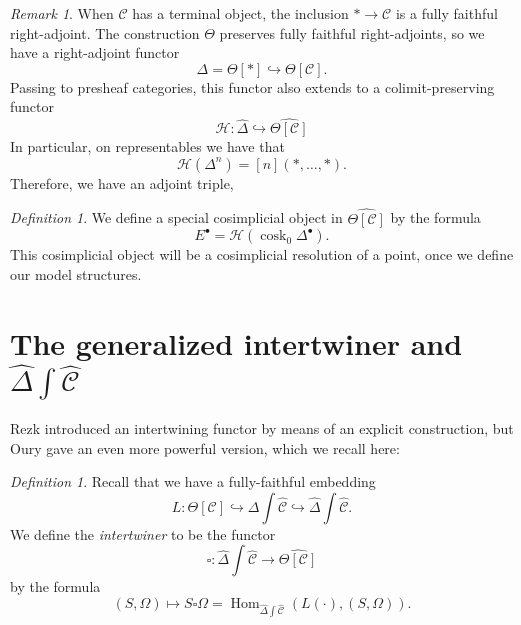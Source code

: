 \documentclass{amsart}
\numberwithin{equation}{section}
\theoremstyle{plain}   %
\theoremstyle{remark}
\newtheorem{rem}[subsection]{Remark}
\newtheorem{defn}[subsection]{Definition}
\theoremstyle{plain}
\DeclareMathOperator{\Hom}{Hom}
\newcommand{\psh}[1]{\ensuremath{\widehat{#1}}}
\newcommand{\C}{\ensuremath{\mathcal{C}}}
\newcommand{\cellset}{\ensuremath{\widehat{\Theta[\mathcal{C}]}}}
\newcommand{\ssetlab}{\ensuremath{\widehat{\Delta} \int \widehat{\mathcal{C}}}}
\begin{document}
\begin{rem} 
	When \(\C\) has a terminal object, the inclusion \(\ast\to \C\) is a fully faithful right-adjoint.  The construction \(\Theta\) preserves fully faithful right-adjoints, so we have a right-adjoint functor \[\Delta=\Theta[\ast] \hookrightarrow \Theta[\C].\]  Passing to presheaf categories, this functor also extends to a colimit-preserving functor 
	\[\mathscr{H}:\psh{\Delta} \hookrightarrow \cellset\]
	In particular, on representables we have that
	\[\mathscr{H}(\Delta^n)=[n](\ast,\dots,\ast).\]
	Therefore, we have an adjoint triple,
	\begin{center}
	\end{center}
\end{rem}

\begin{defn} We define a special cosimplicial object in \(\cellset\) by the formula \[E^\bullet=\mathscr{H}(\operatorname{cosk}_0\Delta^\bullet).\]  This cosimplicial object will be a cosimplicial resolution of a point, once we define our model structures.
\end{defn}

\section{The generalized intertwiner and \(\ssetlab\)}
Rezk introduced an intertwining functor by means of an explicit construction, but Oury gave an even more powerful version, which we recall here:

\begin{defn} Recall that we have a fully-faithful embedding \[L:\Theta[\C]\hookrightarrow \Delta\int\psh{\C}\hookrightarrow \ssetlab.\]  We define the \emph{intertwiner} to be the functor \[\square:\ssetlab \to \cellset\] by the formula \[(S,\Omega)\mapsto S\square\Omega=\Hom_{\ssetlab}(L(\cdot), (S,\Omega)).\]
\end{defn}
\end{document}
